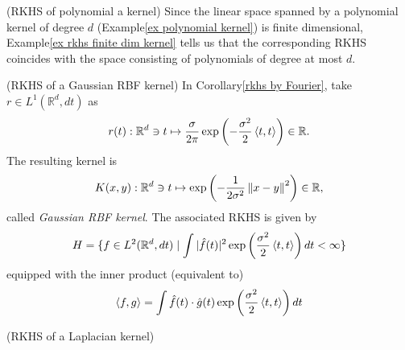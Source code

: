 \documentclass[a4paper,12pt]{article}
\begin{document}
\begin{ex} (RKHS of polynomial a kernel)
	Since the linear space spanned by a polynomial kernel of degree \( d \) (Example\ref{ex polynomial kernel}) is finite dimensional, Example\ref{ex rkhs finite dim kernel} tells us that the corresponding RKHS coincides with the space consisting of polynomials of degree at most \( d \).
	\fin\end{ex}

\begin{ex} (RKHS of a Gaussian RBF kernel)
	In Corollary\ref{rkhs by Fourier}, take \( r \in L^{1}(\mathbb{R}^d, dt) \) as
	\[
		r(t) :\mathbb{R} ^d \ni t \mapsto \frac{\sigma}{2 \pi} \exp \left( - \frac{\sigma^2}{2} \left<t, t \right> \right) \in \mathbb{R}.
	\]
	The resulting kernel is
	\[
		K(x,y) : \mathbb{R} ^d \ni t \mapsto \exp \left( -\frac{1}{2 \sigma^2} \left\| x-y \right\|^2 \right) \in \mathbb{R},
	\]
	called \textit{Gaussian RBF kernel}. The associated RKHS is given by
	\[
		H = \{f \in L^2(\mathbb{R}^d, dt) \mid \int |\hat{f}(t)|^2 \exp \left( \frac{\sigma^2}{2} \left<t, t \right> \right) dt < \infty \}
	\]
	equipped with the inner product (equivalent to)
	\[
		\left<f, g \right> = \int \hat{f}(t)\cdot \hat{g}(t) \exp \left( \frac{\sigma^2}{2} \left<t, t \right> \right) dt
	\]
	\fin\end{ex}

\begin{ex} (RKHS of a Laplacian kernel)
	
	\fin\end{ex}
\end{document}

